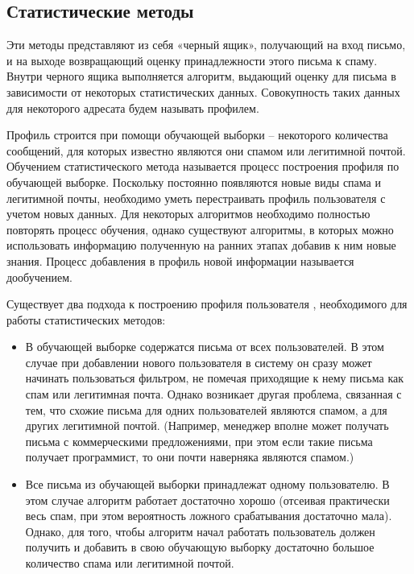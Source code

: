 \subsection{Статистические методы}

Эти методы представляют  из себя «черный ящик», получающий на вход письмо, и на выходе возвращающий оценку принадлежности этого письма к спаму. Внутри черного ящика выполняется алгоритм, выдающий оценку для письма в зависимости от некоторых статистических данных. Совокупность таких данных для некоторого адресата будем называть профилем.

Профиль строится  при помощи обучающей выборки – некоторого количества сообщений, для которых известно являются они спамом или легитимной почтой. Обучением статистического метода называется процесс построения профиля по обучающей выборке. Поскольку постоянно появляются новые виды спама и легитимной почты, необходимо уметь перестраивать профиль пользователя с учетом новых данных. Для некоторых алгоритмов необходимо полностью повторять процесс обучения, однако существуют алгоритмы, в которых можно использовать информацию полученную на ранних этапах добавив к ним новые знания. Процесс добавления в профиль новой информации называется дообучением.

Существует два подхода к построению профиля пользователя , необходимого для работы статистических методов:

\begin{itemize}
\item В обучающей выборке содержатся письма от всех пользователей. В этом случае при добавлении нового пользователя в систему он сразу может начинать пользоваться фильтром, не помечая приходящие к нему письма как спам или  легитимная почта. Однако возникает другая проблема, связанная с тем, что схожие письма для одних пользователей являются спамом, а для других легитимной почтой. (Например, менеджер вполне может получать письма с коммерческими предложениями, при этом если такие письма получает программист, то они почти наверняка являются спамом.)
\item Все письма из обучающей выборки принадлежат одному пользователю. В этом случае алгоритм работает достаточно хорошо (отсеивая практически весь спам, при этом вероятность ложного срабатывания достаточно мала). Однако, для того, чтобы алгоритм начал работать пользователь должен получить и добавить в свою обучающую выборку достаточно большое количество спама или легитимной почтой.
\end{itemize}

